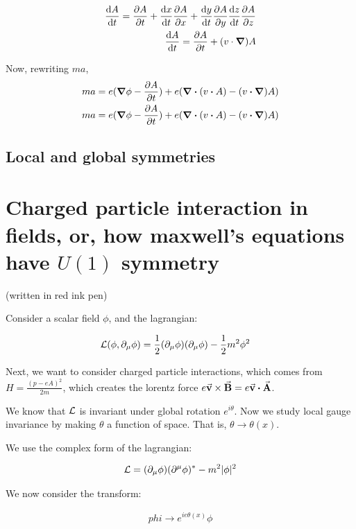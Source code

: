 \begin{align*}
\dv{A}{t} = \pdv{A}{t} + \dv{x}{t}\pdv{A}{x} + \dv{y}{t}\pdv{A}{y} \dv{z}{t}\pdv{A}{z} \\
\dv{A}{t} = \pdv{A}{t} + (v \cdot \grad) A
\end{align*}

Now, rewriting $ma$,
\begin{align*}
ma &= e (\grad \phi - \pdv{A}{t}) + e (\div (v \vdot A) - (v \vdot \grad) A) \\
ma &= e (\grad \phi - \pdv{A}{t}) + e (\div (v \vdot A) - (v \vdot \grad) A)
\end{align*}

\section{Local and global symmetries}

\chapter{Charged particle interaction in fields, or, how maxwell's equations have $U(1)$ symmetry}
(written in red ink pen)

Consider a scalar field $\phi$, and the lagrangian:

\begin{align*}
    &\mathcal{L}(\phi, \partial_\mu \phi) = \frac{1}{2} (\partial_\mu \phi) (\partial_\mu \phi) - \frac{1}{2} m^2 \phi^2
\end{align*}

Next, we want to consider charged particle interactions, which comes from
$H = \frac{(p - eA)^2}{2m}$, which creates the lorentz force $e \va v \times \va B = e \va v \vdot \va A$.

We know that $\mathcal{L}$ is invariant under global rotation $e^{i \theta}$. Now we
study local gauge invariance by making $\theta$ a function of space. That is,
$\theta \to \theta(x)$.

We use the complex form of the lagrangian:

\begin{align*}
    \mathcal{L} = (\partial_\mu \phi) (\partial^\mu \phi)^* - m^2|\phi|^2
\end{align*}

We now consider the transform:

\begin{align*}
    phi \to e^{i e \theta(x)} \phi
\end{align*}

